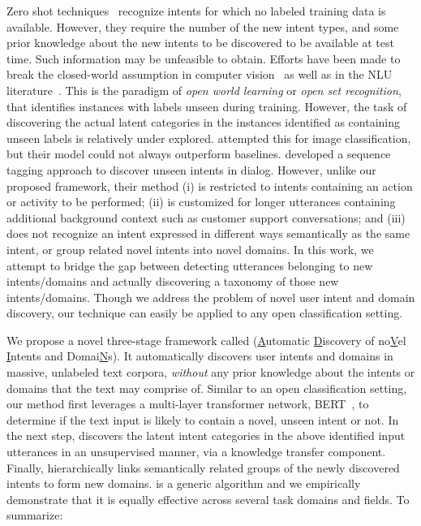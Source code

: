 Zero shot techniques~\cite{kumar2017zero,xia2018} recognize intents for which no labeled training data is available. However, they require the number of the new intent types, and some prior knowledge about the new intents to be discovered to be available at test time. Such information may be unfeasible to obtain. 
Efforts have been made to break the closed-world assumption in computer vision~\cite{scheirer2014probability,bendale2015towards,bendale2016towards,fei2016breaking} as well as in the NLU literature~\cite{shu2017doc,kim2018joint,vedula2019towards,lin2019deep}. This is the paradigm of \textit{open world learning} or \textit{open set recognition}, that identifies instances with labels unseen during training. 
However, the task of discovering the actual latent categories in the instances identified as containing unseen labels is relatively under explored. \cite{shu2018unseen} attempted this for image classification, but their model could not always outperform baselines. \cite{vedula2019towards} developed a sequence tagging approach to discover unseen intents in dialog. However, unlike our proposed framework, their method (i) is restricted to intents containing an action or activity to be performed; (ii) is customized for longer utterances containing additional background context such as customer support conversations; and (iii) does not recognize an intent expressed in different ways semantically as the same intent, or group related novel intents into novel domains. 
In this work, we attempt to bridge the gap between detecting utterances belonging to new intents/domains and actually discovering a taxonomy of those new intents/domains. Though we address the problem of novel user intent and domain discovery, our technique can easily be applied to any open classification setting. 

We propose a novel three-stage framework called \mbox{\textit{\mname{}}} (\underline{A}utomatic \underline{D}iscovery of no\underline{V}el \underline{I}ntents and Domai\underline{N}s). It automatically discovers user intents and domains in massive, unlabeled text corpora, \textit{without} any prior knowledge about the intents or domains that the text may comprise of. 
Similar to an open classification setting, our method first leverages a multi-layer transformer network, BERT~\cite{devlin2018bert}, to determine if the text input is likely to contain a novel, unseen intent or not. In the next step, \mname{} discovers the latent intent categories in the above identified input utterances in an unsupervised manner, via a knowledge transfer component. %
Finally, \mname{} hierarchically links semantically related groups of the newly discovered intents to form new domains. 
\mname{} is a generic algorithm and we empirically demonstrate that it is equally effective across several task domains and fields. %
To summarize:

